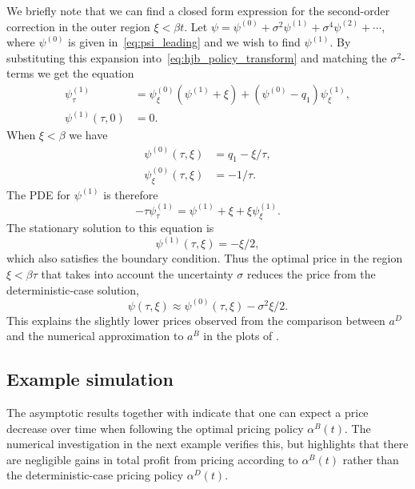 \documentclass[main.tex]{subfiles}
\begin{document}
We briefly note that we can find a closed form expression for the
second-order correction in the outer region $\xi < \beta t$. Let $\psi
= \psi^{(0)} + \sigma^2 \psi^{(1)} +
\sigma^4\psi^{(2)}+\cdots$, where $\psi^{(0)}$ is given
in~\eqref{eq:psi_leading} and we wish to find $\psi^{(1)}$.
By substituting this expansion into~\eqref{eq:hjb_policy_transform} and
matching the $\sigma^2$-terms we get the equation
\begin{align}
  \psi_\tau^{(1)}
  &= \psi_\xi^{(0)}(\psi^{(1)}+\xi) + (\psi^{(0)}- q_1)\psi_\xi^{(1)},\\
  \psi^{(1)}(\tau,0) &= 0.
\end{align}
When $\xi<\beta$ we have
\begin{align}
  \psi^{(0)}(\tau,\xi) &= q_1 - \xi/\tau,\\
  \psi_\xi^{(0)}(\tau,\xi) &= -1/\tau.
\end{align}
The PDE for $\psi^{(1)}$ is therefore
\begin{equation}
  - \tau \psi_\tau^{(1)} =\psi^{(1)} + \xi + \xi\psi_\xi^{(1)}.
\end{equation}
The stationary solution to this equation is
\begin{equation}
  \psi^{(1)}(\tau,\xi) = -\xi/2,
\end{equation}
which also satisfies the boundary condition.
Thus the optimal price in the region $\xi<\beta \tau$
that takes into account the uncertainty $\sigma$ reduces the price
from the deterministic-case solution,
\begin{equation}
  \psi(\tau,\xi)\approx \psi^{(0)}(\tau,\xi)-\sigma^2\xi/2.
\end{equation}
This explains the slightly lower prices observed from the comparison
between $a^D$ and the numerical approximation to $a^B$ in the plots of
.



\subsection{Example simulation}
The asymptotic results together with  indicate that
one can expect a price decrease over time when following the optimal
pricing policy $\alpha^B(t)$.  The numerical investigation in the next
example verifies this, but highlights that there are negligible gains
in total profit from pricing according to $\alpha^B(t)$ rather than
the deterministic-case pricing policy $\alpha^D(t)$.
\end{document}
